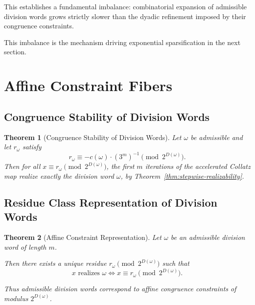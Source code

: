 \documentclass[12pt, oneside]{article}
\numberwithin{equation}{section}
\theoremstyle{definition}
\theoremstyle{plain}
\newtheorem{theorem}{Theorem}[section]
\theoremstyle{remark}
\begin{document}
This establishes a fundamental imbalance: combinatorial expansion of admissible
division words grows strictly slower than the dyadic refinement imposed by their
congruence constraints.

This imbalance is the mechanism driving exponential sparsification in the next section.

\section{Affine Constraint Fibers}
\label{sec:affine-constraint-fibers}

\subsection{Congruence Stability of Division Words}

\begin{theorem}[Congruence Stability of Division Words]
Let $\omega$ be admissible and let $r_\omega$ satisfy
\[
r_\omega \equiv -c(\omega)\cdot (3^m)^{-1} \pmod{2^{D(\omega)}}.
\]
Then for all $x \equiv r_\omega \pmod{2^{D(\omega)}}$, the first $m$ iterations
of the accelerated Collatz map realize exactly the division word $\omega$,
by Theorem~\ref{thm:stepwise-realizability}.
\end{theorem}

\subsection{Residue Class Representation of Division Words}

\begin{theorem}[Affine Constraint Representation]
Let $\omega$ be an admissible division word of length $m$.

Then there exists a unique residue $r_\omega \pmod{2^{D(\omega)}}$ such that
\[
x \text{ realizes } \omega \iff x \equiv r_\omega \pmod{2^{D(\omega)}}.
\]

Thus admissible division words correspond to affine congruence constraints
of modulus $2^{D(\omega)}$.
\end{theorem}
\end{document}
